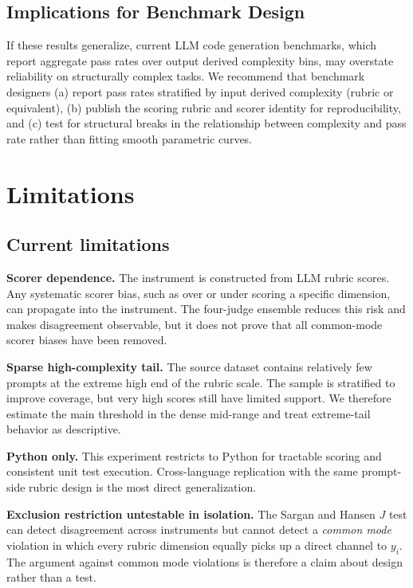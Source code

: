 \documentclass{article}
\begin{document}
\subsection{Implications for Benchmark Design}
If these results generalize, current LLM code generation benchmarks, which report aggregate pass rates over output derived complexity bins, may overstate reliability on structurally complex tasks. We recommend that benchmark designers (a) report pass rates stratified by input derived complexity (rubric or equivalent), (b) publish the scoring rubric and scorer identity for reproducibility, and (c) test for structural breaks in the relationship between complexity and pass rate rather than fitting smooth parametric curves.

\section{Limitations}
\label{sec:limitations}

\subsection{Current limitations}

\textbf{Scorer dependence.} The instrument is constructed from LLM rubric scores. Any systematic scorer bias, such as over or under scoring a specific dimension, can propagate into the instrument. The four-judge ensemble reduces this risk and makes disagreement observable, but it does not prove that all common-mode scorer biases have been removed.

\textbf{Sparse high-complexity tail.} The source dataset contains relatively few prompts at the extreme high end of the rubric scale. The sample is stratified to improve coverage, but very high scores still have limited support. We therefore estimate the main threshold in the dense mid-range and treat extreme-tail behavior as descriptive.

\textbf{Python only.} This experiment restricts to Python for tractable scoring and consistent unit test execution. Cross-language replication with the same prompt-side rubric design is the most direct generalization.

\textbf{Exclusion restriction untestable in isolation.} The Sargan and Hansen $J$ test can detect disagreement across instruments but cannot detect a \emph{common mode} violation in which every rubric dimension equally picks up a direct channel to $y_i$. The argument against common mode violations is therefore a claim about design rather than a test.
\end{document}
